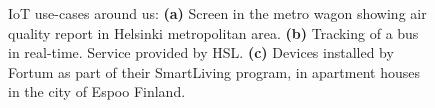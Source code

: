 \documentclass[english, 12pt, a4paper, elec, utf8, online]{aaltothesis}
\begin{document}
\begin{figure}[h!]
\centering
{}
\caption{IoT use-cases around us: \textbf{(a)} Screen in the metro wagon showing air quality report in Helsinki metropolitan area. \textbf{(b)} Tracking of a bus in real-time. Service provided by HSL. \textbf{(c)} Devices installed by Fortum as part of their SmartLiving program, in apartment houses in the city of Espoo Finland.  }\label{fig:iot_in_our_lifes}
\end{figure}
\end{document}
